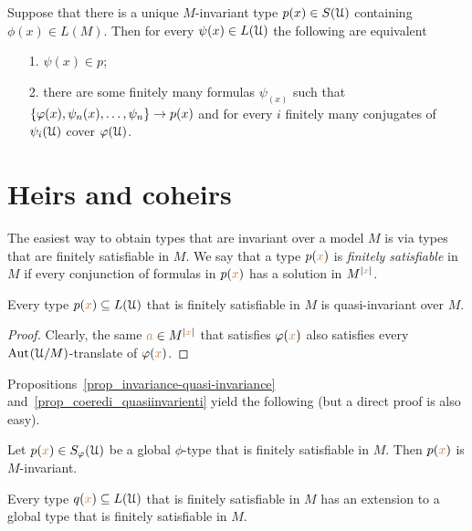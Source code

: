 \documentclass[creche.tex]{subfiles}
\begin{document}
\begin{exercise}
  Suppose that there is a unique $M$-invariant type $p(x)\in S(\EuScript U)$ containing $\phi(x)\in L(M)$.
  Then for every $\psi(x)\in L(\EuScript U)$ the following are equivalent
  \begin{itemize}
    \item[1.] $\psi(x)\in p$;
    \item[2.] there are some finitely many formulas $\psi_(x)$ such that $\{\varphi(x),\psi_n(x),\dots,\psi_n\}\rightarrow p(x)$ and for every $i$ finitely many conjugates of $\psi_i(\EuScript U)$ cover $\varphi(\EuScript U)$.  
  \end{itemize}
\end{exercise}

\section{Heirs and coheirs}
\label{coheirs}

The easiest way to obtain types that are invariant over a model $M$ is via types that are finitely satisfiable in $M$.
We say that a type $p({\color{brown} x})$ is  \emph{finitely satisfiable\/} in $M$ if every conjunction of formulas in $p({\color{brown} x})$ has a solution in $M^{|{\color{brown} x}|}$.

\begin{proposition}\label{prop_coeredi_quasiinvarienti}
Every type $p({\color{brown} x})\subseteq L(\EuScript U)$ that is finitely satisfiable in $M$ is quasi-invariant over $M$.
\end{proposition}

\begin{proof}
Clearly, the same ${\color{brown} a}\in M^{|{\color{brown} x}|}$ that satisfies $\varphi({\color{brown} x})$ also satisfies every ${\rm Aut\kern.15ex}(\EuScript U/M)$-translate of $\varphi({\color{brown} x})$.
\end{proof}

Propositions~\ref{prop_invariance-quasi-invariance} and~\ref{prop_coeredi_quasiinvarienti} yield the following (but a direct proof is also easy).

\begin{proposition}\label{prop_coeredi_invarienti}
Let $p({\color{brown} x})\in S_{\varphi}(\EuScript U)$ be a global $\phi$-type that is finitely satisfiable in $M$.
Then $p({\color{brown} x})$ is $M$-in\-vari\-ant.\QED
\end{proposition}

\begin{proposition}\label{prop_exisntence_coheirs}
Every type $q({\color{brown} x})\subseteq L(\EuScript U)$ that is finitely satisfiable in $M$ has an extension to a global type that is finitely satisfiable in $M$.
\end{proposition}
\end{document}
